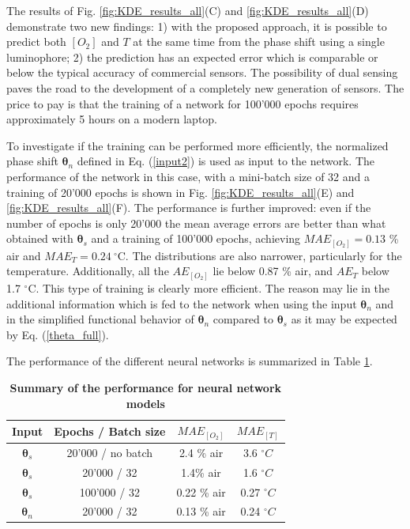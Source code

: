\documentclass[final,5p,times,twocolumn]{elsarticle}
\begin{document}
The results of Fig. \ref{fig:KDE_results_all}(C) and \ref{fig:KDE_results_all}(D) demonstrate two new findings: 1) with the proposed approach, it is possible to predict both $[O_2]$ and $T$ at the same time from the phase shift using a single luminophore; 2) the prediction has an expected error which is comparable or below the typical accuracy of commercial sensors. The possibility of dual sensing paves the road to the development of a completely new generation of sensors.
The price to pay is that the training of a network for 100'000 epochs requires approximately 5 hours on a modern laptop.

To investigate if the training can be performed more efficiently, the normalized phase shift ${\pmb \theta}_n$ defined in Eq. (\ref{input2}) is used as input to the network. The performance of the network in this case, with a mini-batch size of 32 and a training of 20'000 epochs is shown in Fig. \ref{fig:KDE_results_all}(E) and \ref{fig:KDE_results_all}(F). The performance is further improved: even if the number of epochs is only 20'000 the mean average errors are better than what obtained with ${\pmb \theta}_s$ and a training of 100'000 epochs, achieving $MAE_{[O_2]}=0.13$ \% air and $MAE_{T}=0.24 \ ^\circ$C. The distributions are also narrower, particularly for the temperature. Additionally, all the $AE_{[O_2]}$ lie below 0.87 \% air, and  $AE_{T}$ below 1.7 $^\circ$C. This type of training is clearly more efficient. The reason may lie in the additional information which is fed to the network when using the input ${\pmb \theta}_n$ and in the simplified functional behavior of ${\pmb \theta}_n$ compared to ${\pmb \theta}_s$ as it may be expected by Eq. (\ref{theta_full}).


The performance of the different neural networks is summarized in Table \ref{TableMAE_summary}. 
\begin{table}[hbt]
\centering
\caption {\bf Summary of the performance for neural network models}

\begin{tabular}{ cccc}
\smallskip 
 Input & Epochs / Batch size & $MAE_{[O_2]}$ & $MAE_{[T]}$  \\ 
 \hline
${\pmb \theta}_s$ & 20'000 / \textrm{no batch} & 2.4 \% air & 3.6 $^\circ C$\\ 
${\pmb \theta}_s$ & 20'000 / 32 & 1.4\% air & 1.6 $^\circ C$\\ 
${\pmb \theta}_s$& 100'000 / 32 & 0.22 \% air & 0.27 $^\circ C$\\ 
${\pmb \theta}_n$ & 20'000 / 32 & 0.13 \% air & 0.24 $^\circ C$\\ 
\end{tabular}
\label{TableMAE_summary}
\end{table}
\end{document}

